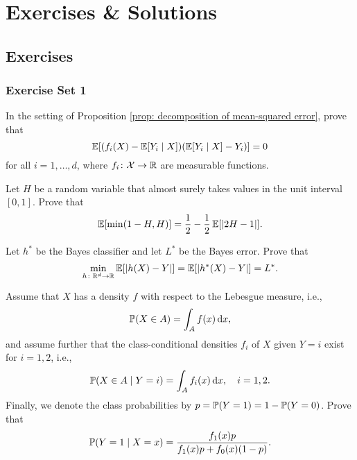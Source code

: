 \part{Exercises \& Solutions}

\chapter{Exercises}

\section{Exercise Set 1}

\begin{exercise}
In the setting of Proposition \ref{prop: decomposition of mean-squared error}, prove that
\[
    \operatorname{\mathbb{E}}[(f_i(X) - \operatorname{\mathbb{E}}[Y_i \mathrel{|} X]) (\operatorname{\mathbb{E}}[Y_i \mathrel{|} X] - Y_i)] = 0
\]
for all $i = 1, \dots, d$, where $f_i \colon \mathcal{X} \to \mathbb{R}$ are measurable functions.
\end{exercise}


\begin{exercise}
Let $H$ be a random variable that almost surely takes values in the unit interval $[0, 1]$. Prove that
\[
    \operatorname{\mathbb{E}}[\min(1-H, H)] = \frac{1}{2} - \frac{1}{2}\operatorname{\mathbb{E}}[\abs{2H - 1}].
\]
\end{exercise}


\begin{exercise}
Let $h^*$ be the Bayes classifier and let $L^*$ be the Bayes error. Prove that
\[
    \min_{h \colon \mathbb{R}^d \to \mathbb{R}} \operatorname{\mathbb{E}}[\abs{h(X) - Y}] = \operatorname{\mathbb{E}}[\abs{h^*(X) - Y}] = L^*.
\]
\end{exercise}


\begin{exercise}
Assume that $X$ has a density $f$ with respect to the Lebesgue measure, i.e.,
\[
    \operatorname{\mathbb{P}}(X \in A) = \int_A f(x) \, \mathrm{d}x,
\]
and assume further that the class-conditional densities $f_i$ of $X$ given $Y = i$ exist for $i = 1, 2$, i.e.,
\[
    \operatorname{\mathbb{P}}(X \in A \mathrel{|} Y = i) = \int_A f_i(x) \, \mathrm{d}x, \quad i = 1, 2.
\]
Finally, we denote the class probabilities by $p = \operatorname{\mathbb{P}}(Y = 1) = 1 - \operatorname{\mathbb{P}}(Y = 0)$. Prove that
\[
    \operatorname{\mathbb{P}}(Y = 1 \mathrel{|} X = x) = \frac{f_1(x)p}{f_1(x)p + f_0(x) (1-p)}.
\]
\end{exercise}
